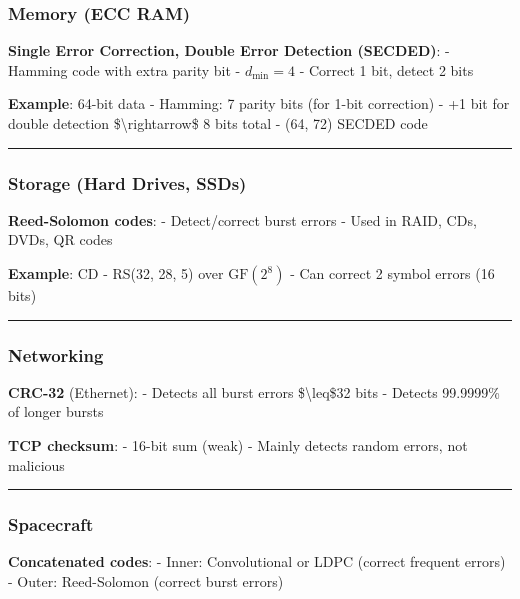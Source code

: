 \subsubsection{Memory (ECC RAM)}\label{memory-ecc-ram}

\textbf{Single Error Correction, Double Error Detection (SECDED)}: -
Hamming code with extra parity bit - \(d_{\min} = 4\) - Correct 1 bit,
detect 2 bits

\textbf{Example}: 64-bit data - Hamming: 7 parity bits (for 1-bit
correction) - +1 bit for double detection \$\textbackslash rightarrow\$
8 bits total - (64, 72) SECDED code

\begin{center}\rule{0.5\linewidth}{0.5pt}\end{center}

\subsubsection{Storage (Hard Drives,
SSDs)}\label{storage-hard-drives-ssds}

\textbf{Reed-Solomon codes}: - Detect/correct burst errors - Used in
RAID, CDs, DVDs, QR codes

\textbf{Example}: CD - RS(32, 28, 5) over \(\mathrm{GF}(2^8)\) - Can
correct 2 symbol errors (16 bits)

\begin{center}\rule{0.5\linewidth}{0.5pt}\end{center}

\subsubsection{Networking}\label{networking}

\textbf{CRC-32} (Ethernet): - Detects all burst errors
\$\textbackslash leq\$32 bits - Detects 99.9999\% of longer bursts

\textbf{TCP checksum}: - 16-bit sum (weak) - Mainly detects random
errors, not malicious

\begin{center}\rule{0.5\linewidth}{0.5pt}\end{center}

\subsubsection{Spacecraft}\label{spacecraft}

\textbf{Concatenated codes}: - Inner: Convolutional or LDPC (correct
frequent errors) - Outer: Reed-Solomon (correct burst errors)

